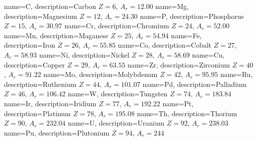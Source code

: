 {
    name=C,
    description={Carbon $Z = 6$, $A_r = 12.00$}
}
{
    name=Mg,
    description={Magnesium $Z = 12$, $A_r = 24.30$}
}
{
    name=P,
    description={Phosphorus $Z = 15$, $A_r = 30.97$}
}
{
    name=Cr,
    description={Chromium $Z = 24$, $A_r = 52.00$}
}
{
    name=Mn,
    description={Maganese $Z = 25$, $A_r = 54.94$}
}
{
    name=Fe,
    description={Iron $Z = 26$, $A_r = 55.85$}
}
{
    name=Co,
    description={Cobalt $Z = 27$, $A_r = 58.93$}
}
{
    name=Ni,
    description={Nickel $Z = 28$, $A_r = 58.69$}
}
{
    name=Cu,
    description={Copper $Z = 29$, $A_r = 63.55$}
}
{
    name=Zr,
    description={Zirconium $Z = 40$, $A_r = 91.22$}
}
{
    name=Mo,
    description={Molybdenum $Z = 42$, $A_r = 95.95$}
}
{
    name=Ru,
    description={Ruthenium $Z = 44$, $A_r = 101.07$}
}
{
    name=Pd,
    description={Palladium $Z = 46$, $A_r = 106.42$}
}
{
    name=W,
    description={Tungsten $Z = 74$, $A_r = 183.84$}
}
{
    name=Ir,
    description={Iridium $Z = 77$, $A_r = 192.22$}
}
{
    name=Pt,
    description={Platinum $Z = 78$, $A_r = 195.08$}
}
{
    name=Th,
    description={Thorium $Z = 90$, $A_r = 232.04$}
}
{
    name=U,
    description={Uranium $Z = 92$, $A_r = 238.03$}
}
{
    name=Pu,
    description={Plutonium $Z = 94$, $A_r = 244$}
}



